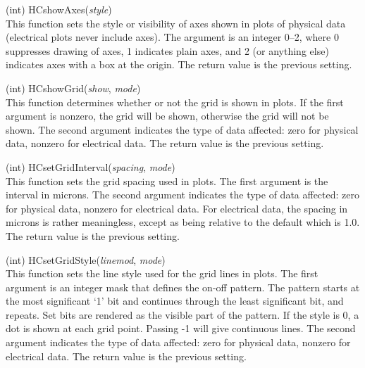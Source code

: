 \begin{description}
\item{(int) \vt HCshowAxes({\it style\/})}\\
This function sets the style or visibility of axes shown in plots of
physical data (electrical plots never include axes).  The argument is
an integer 0--2, where 0 suppresses drawing of axes, 1 indicates plain
axes, and 2 (or anything else) indicates axes with a box at the
origin.  The return value is the previous setting.

\item{(int) \vt HCshowGrid({\it show\/}, {\it mode\/})}\\
This function determines whether or not the grid is shown in plots. 
If the first argument is nonzero, the grid will be shown, otherwise
the grid will not be shown.  The second argument indicates the type of
data affected:  zero for physical data, nonzero for electrical data. 
The return value is the previous setting.

\item{(int) \vt HCsetGridInterval({\it spacing\/}, {\it mode\/})}\\
This function sets the grid spacing used in plots.  The first argument
is the interval in microns.  The second argument indicates the type of
data affected:  zero for physical data, nonzero for electrical data. 
For electrical data, the spacing in microns is rather meaningless,
except as being relative to the default which is 1.0.  The return
value is the previous setting.

\item{(int) \vt HCsetGridStyle({\it linemod\/}, {\it mode\/})}\\
This function sets the line style used for the grid lines in plots. 
The first argument is an integer mask that defines the on-off pattern. 
The pattern starts at the most significant `1' bit and continues
through the least significant bit, and repeats.  Set bits are rendered
as the visible part of the pattern.  If the style is 0, a dot is shown
at each grid point.  Passing -1 will give continuous lines.  The
second argument indicates the type of data affected:  zero for
physical data, nonzero for electrical data.  The return value is the
previous setting.


\end{description}
